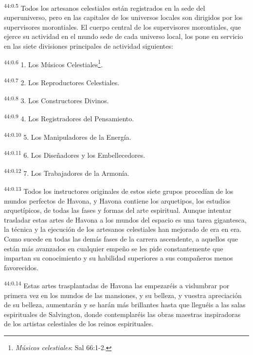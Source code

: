 \par
\textsuperscript{44:0.5} Todos los artesanos celestiales están registrados en la sede del superuniverso, pero en las capitales de los universos locales son dirigidos por los supervisores morontiales. El cuerpo central de los supervisores morontiales, que ejerce su actividad en el mundo sede de cada universo local, los pone en servicio en las siete divisiones principales de actividad siguientes:

\par
\textsuperscript{44:0.6} 1. Los Músicos Celestiales\footnote{\textit{Músicos celestiales}: Sal 66:1-2.}.

\par
\textsuperscript{44:0.7} 2. Los Reproductores Celestiales.

\par
\textsuperscript{44:0.8} 3. Los Constructores Divinos.

\par
\textsuperscript{44:0.9} 4. Los Registradores del Pensamiento.

\par
\textsuperscript{44:0.10} 5. Los Manipuladores de la Energía.

\par
\textsuperscript{44:0.11} 6. Los Diseñadores y los Embellecedores.

\par
\textsuperscript{44:0.12} 7. Los Trabajadores de la Armonía.

\par
\textsuperscript{44:0.13} Todos los instructores originales de estos siete grupos procedían de los mundos perfectos de Havona, y Havona contiene los arquetipos, los estudios arquetípicos, de todas las fases y formas del arte espiritual. Aunque intentar trasladar estas artes de Havona a los mundos del espacio es una tarea gigantesca, la técnica y la ejecución de los artesanos celestiales han mejorado de era en era. Como sucede en todas las demás fases de la carrera ascendente, a aquellos que están más avanzados en cualquier empeño se les pide constantemente que impartan su conocimiento y su habilidad superiores a sus compañeros menos favorecidos.

\par
\textsuperscript{44:0.14} Estas artes trasplantadas de Havona las empezaréis a vislumbrar por primera vez en los mundos de las mansiones, y su belleza, y vuestra apreciación de su belleza, aumentarán y se harán más brillantes hasta que lleguéis a las salas espirituales de Salvington, donde contemplaréis las obras maestras inspiradoras de los artistas celestiales de los reinos espirituales.

